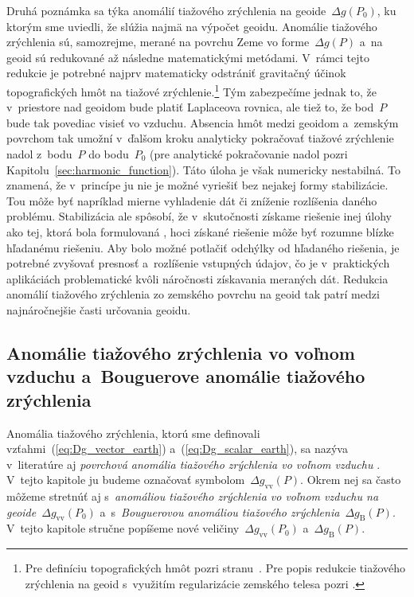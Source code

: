\documentclass[a4paper, 12pt]{book}
\begin{document}
Druhá poznámka sa týka anomálií tiažového zrýchlenia na geoide~$\Delta g(P_0)$, 
ku ktorým sme uviedli, že slúžia najmä na výpočet geoidu.  Anomálie tiažového 
zrýchlenia sú, samozrejme, merané na povrchu Zeme vo forme~$\Delta g(P)$ a~na 
geoid sú redukované až následne matematickými metódami.  V~rámci tejto redukcie 
je potrebné najprv matematicky odstrániť gravitačný účinok topografických hmôt 
na tiažové zrýchlenie.\footnote{Pre definíciu topografických hmôt pozri 
stranu~\pageref{def:topographic_masses}.  Pre popis redukcie tiažového 
zrýchlenia na geoid s~využitím regularizácie zemského telesa pozri 
\textcite{Janak2006}.}  Tým zabezpečíme jednak to, že v~priestore nad geoidom 
bude platiť Laplaceova rovnica, ale tiež to, že bod~$P$ bude tak povediac 
visieť vo vzduchu.  Absencia hmôt medzi geoidom a~zemským povrchom tak umožní 
v~ďalšom kroku analyticky pokračovať tiažové zrýchlenie nadol z~bodu~$P$ do 
bodu~$P_0$ (pre analytické pokračovanie nadol pozri 
Kapitolu~\ref{sec:harmonic_function}).  Táto úloha je však numericky 
nestabilná.  To znamená, že v~princípe ju nie je možné vyriešiť bez nejakej 
formy stabilizácie.  Tou môže byť napríklad mierne vyhladenie dát či zníženie 
rozlíšenia daného problému.  Stabilizácia ale spôsobí, že v~skutočnosti získame 
riešenie inej úlohy ako tej, ktorá bola formulovaná 
\parencite{SansoGeodeticBoundaryValueProblem}, hoci získané riešenie môže byť 
rozumne blízke hľadanému riešeniu.  Aby bolo možné potlačiť odchýlky od 
hľadaného riešenia, je potrebné zvyšovať presnosť a~rozlíšenie vstupných 
údajov, čo je v~praktických aplikáciách problematické kvôli náročnosti 
získavania meraných dát.  Redukcia anomálií tiažového zrýchlenia zo zemského 
povrchu na geoid tak patrí medzi najnáročnejšie časti určovania geoidu.





\subsection{Anomálie tiažového zrýchlenia vo voľnom vzduchu a~Bouguerove 
anomálie tiažového zrýchlenia}

Anomália tiažového zrýchlenia, ktorú sme definovali 
vzťahmi~(\ref{eq:Dg_vector_earth}) a~(\ref{eq:Dg_scalar_earth}), sa nazýva 
v~literatúre aj \emph{povrchová anomália tiažového zrýchlenia vo voľnom 
vzduchu} \parencite{SansoGeoidDetermination}.  V~tejto kapitole ju budeme 
označovať symbolom~$\Delta g_{\mathrm{vv}}(P)$.  Okrem nej sa často môžeme 
stretnúť aj s~\emph{anomáliou tiažového zrýchlenia vo voľnom vzduchu na 
geoide}~$\Delta g_{\mathrm{vv}}(P_0)$ a~s~\emph{Bouguerovou anomáliou tiažového 
zrýchlenia}~$\Delta g_{\mathrm{B}}(P)$.  V~tejto kapitole stručne popíšeme nové 
veličiny~$\Delta g_{\mathrm{vv}}(P_0)$ a~$\Delta g_{\mathrm{B}}(P)$.
\end{document}
